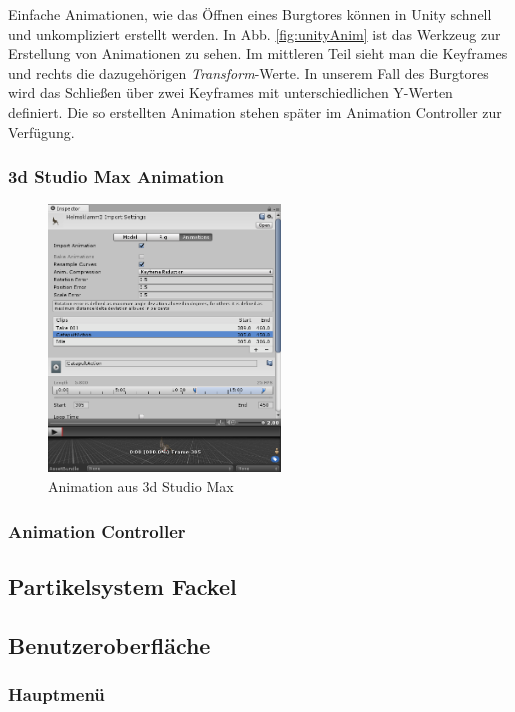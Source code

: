Einfache Animationen, wie das Öffnen eines Burgtores können in Unity schnell und unkompliziert erstellt werden. In Abb. \ref{fig:unityAnim} ist das Werkzeug zur Erstellung von Animationen zu sehen. Im mittleren Teil sieht man die Keyframes und rechts die dazugehörigen \textit{Transform}-Werte. In unserem Fall des Burgtores wird das Schließen über zwei Keyframes mit unterschiedlichen Y-Werten definiert. Die so erstellten Animation stehen später im Animation Controller zur Verfügung.

\subsubsection{3d Studio Max Animation}

\begin{figure}
	\begin{center}
		\includegraphics[width=0.55\textwidth]{Abbildungen/Unity/3dsAnim}
	\end{center}
	\caption{Animation aus 3d Studio Max}
	\label{fig:3dsAnim}
\end{figure}

\blindtext

\subsubsection{Animation Controller}


\subsection{Partikelsystem Fackel}

\subsection{Benutzeroberfläche}
\subsubsection{Hauptmenü}
\subsubsection{}






 

